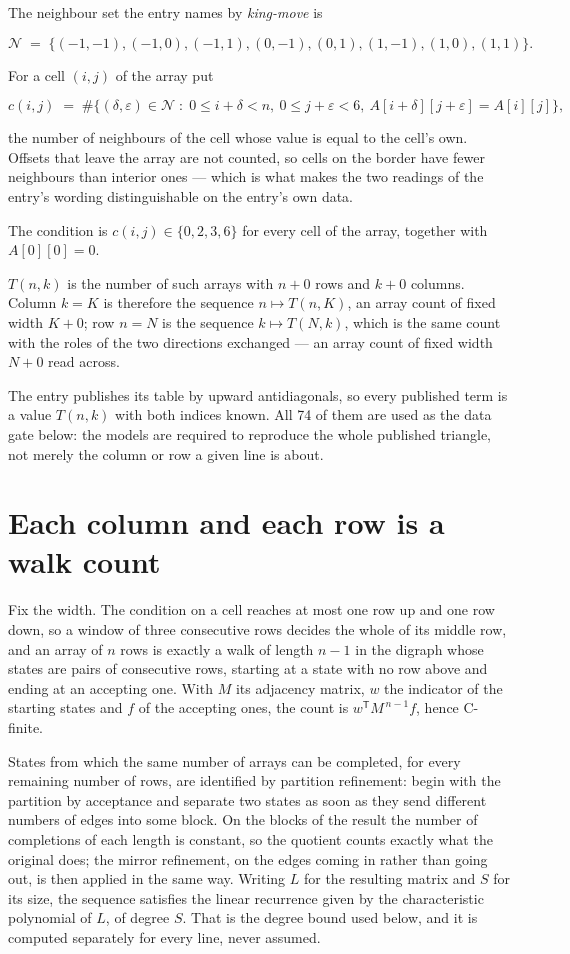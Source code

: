 \documentclass[11pt]{article}
\theoremstyle{definition}
\begin{document}
The neighbour set the entry names by {\itshape king-move} is

\[\mathcal{N} \;=\; \{(-1,-1), (-1,0), (-1,1), (0,-1), (0,1), (1,-1), (1,0), (1,1)\}.\]

For a cell $(i,j)$ of the array put

\[c(i,j) \;=\; \#\bigl\{(\delta,\varepsilon)\in\mathcal{N} \;:\; 0\le i+\delta<n,\ 0\le j+\varepsilon<6,\ A[i+\delta][j+\varepsilon] = A[i][j]\bigr\},\]

the number of neighbours of the cell whose value is equal to the cell's own. Offsets that leave the array are not counted, so cells on the border have fewer neighbours than interior ones --- which is what makes the two readings of the entry's wording distinguishable on the entry's own data.

The condition is $c(i,j) \in \{0, 2, 3, 6\}$ for every cell of the array, together with $A[0][0]=0$.

$T(n,k)$ is the number of such arrays with $n + 0$ rows and $k + 0$ columns. Column $k = K$ is therefore the sequence $n \mapsto T(n,K)$, an array count of fixed width $K + 0$; row $n = N$ is the sequence $k \mapsto T(N,k)$, which is the same count with the roles of the two directions exchanged --- an array count of fixed width $N + 0$ read across.

The entry publishes its table by upward antidiagonals, so every published term is a value $T(n,k)$ with both indices known. All 74 of them are used as the data gate below: the models are required to reproduce the whole published triangle, not merely the column or row a given line is about.

\section{Each column and each row is a walk count}

Fix the width. The condition on a cell reaches at most one row up and one row down, so a window of three consecutive rows decides the whole of its middle row, and an array of $n$ rows is exactly a walk of length $n-1$ in the digraph whose states are pairs of consecutive rows, starting at a state with no row above and ending at an accepting one. With $M$ its adjacency matrix, $w$ the indicator of the starting states and $f$ of the accepting ones, the count is $w^{\mathsf T}M^{\,n-1}f$, hence C-finite.

States from which the same number of arrays can be completed, for every remaining number of rows, are identified by partition refinement: begin with the partition by acceptance and separate two states as soon as they send different numbers of edges into some block. On the blocks of the result the number of completions of each length is constant, so the quotient counts exactly what the original does; the mirror refinement, on the edges coming in rather than going out, is then applied in the same way. Writing $L$ for the resulting matrix and $S$ for its size, the sequence satisfies the linear recurrence given by the characteristic polynomial of $L$, of degree $S$. That is the degree bound used below, and it is computed separately for every line, never assumed.
\end{document}
